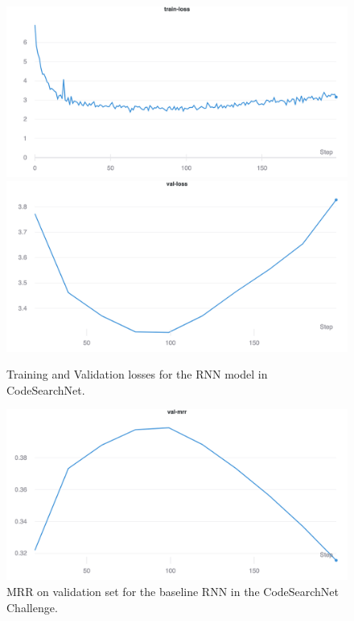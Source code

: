 \documentclass[10pt,twocolumn]{article}
\begin{document}
\begin{figure}[!ht]
    \centering
    \includegraphics[scale=0.1]{figures/rnn/train-loss.png}
    \includegraphics[scale=0.1]{figures/rnn/val-loss.png}
    \caption{Training and Validation losses for the RNN model in CodeSearchNet.}
    \label{fig:train_valid_neural_rnn_model}
\end{figure}

\begin{figure}[!ht]
    \centering
    \includegraphics[scale=0.15]{figures/rnn/val-mrr.png}
    \caption{MRR on validation set for the baseline RNN in the CodeSearchNet Challenge.}
    \label{fig:val_mrr_rnn}
\end{figure}
\end{document}
